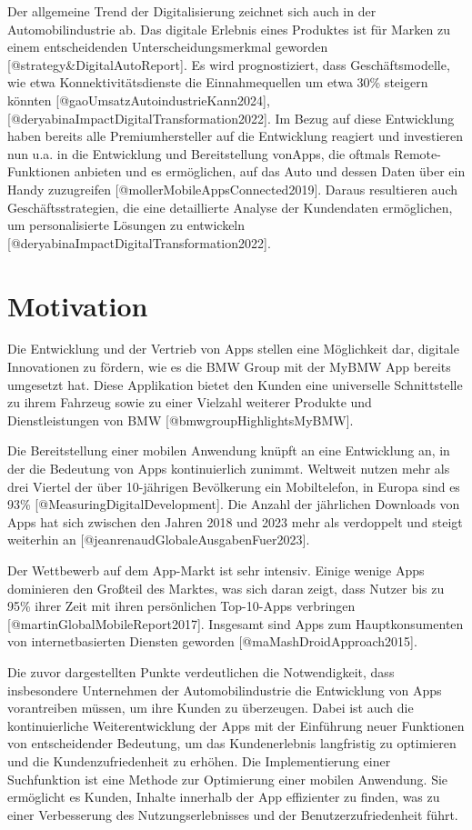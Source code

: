 \documentclass[
  12pt,
  a4paperpaper,
]{report}
\begin{document}
Der allgemeine Trend der Digitalisierung zeichnet sich auch in der
Automobilindustrie ab. Das digitale Erlebnis eines Produktes ist für
Marken zu einem entscheidenden Unterscheidungsmerkmal geworden
{[}@strategy\&DigitalAutoReport{]}. Es wird prognostiziert, dass
Geschäftsmodelle, wie etwa Konnektivitätsdienste die Einnahmequellen um
etwa 30\thinspace\% steigern könnten
{[}@gaoUmsatzAutoindustrieKann2024{]},
{[}@deryabinaImpactDigitalTransformation2022{]}. Im Bezug auf diese
Entwicklung haben bereits alle Premiumhersteller auf die Entwicklung
reagiert und investieren nun u.a. in die Entwicklung und Bereitstellung
vonApps, die oftmals Remote-Funktionen anbieten und es ermöglichen, auf
das Auto und dessen Daten über ein Handy zuzugreifen
{[}@mollerMobileAppsConnected2019{]}. Daraus resultieren auch
Geschäftsstrategien, die eine detaillierte Analyse der Kundendaten
ermöglichen, um personalisierte Lösungen zu entwickeln
{[}@deryabinaImpactDigitalTransformation2022{]}.

\section{Motivation}\label{motivation}

Die Entwicklung und der Vertrieb von Apps stellen eine Möglichkeit dar,
digitale Innovationen zu fördern, wie es die BMW Group mit der MyBMW App
bereits umgesetzt hat. Diese Applikation bietet den Kunden eine
universelle Schnittstelle zu ihrem Fahrzeug sowie zu einer Vielzahl
weiterer Produkte und Dienstleistungen von BMW
{[}@bmwgroupHighlightsMyBMW{]}.

Die Bereitstellung einer mobilen Anwendung knüpft an eine Entwicklung
an, in der die Bedeutung von Apps kontinuierlich zunimmt. Weltweit
nutzen mehr als drei Viertel der über 10-jährigen Bevölkerung ein
Mobiltelefon, in Europa sind es 93\thinspace\%
{[}@MeasuringDigitalDevelopment{]}. Die Anzahl der jährlichen Downloads
von Apps hat sich zwischen den Jahren 2018 und 2023 mehr als verdoppelt
und steigt weiterhin an {[}@jeanrenaudGlobaleAusgabenFuer2023{]}.

Der Wettbewerb auf dem App-Markt ist sehr intensiv. Einige wenige Apps
dominieren den Großteil des Marktes, was sich daran zeigt, dass Nutzer
bis zu 95\thinspace\% ihrer Zeit mit ihren persönlichen Top-10-Apps
verbringen {[}@martinGlobalMobileReport2017{]}. Insgesamt sind Apps zum
Hauptkonsumenten von internetbasierten Diensten geworden
{[}@maMashDroidApproach2015{]}.

Die zuvor dargestellten Punkte verdeutlichen die Notwendigkeit, dass
insbesondere Unternehmen der Automobilindustrie die Entwicklung von Apps
vorantreiben müssen, um ihre Kunden zu überzeugen. Dabei ist auch die
kontinuierliche Weiterentwicklung der Apps mit der Einführung neuer
Funktionen von entscheidender Bedeutung, um das Kundenerlebnis
langfristig zu optimieren und die Kundenzufriedenheit zu erhöhen. Die
Implementierung einer Suchfunktion ist eine Methode zur Optimierung
einer mobilen Anwendung. Sie ermöglicht es Kunden, Inhalte innerhalb der
App effizienter zu finden, was zu einer Verbesserung des
Nutzungserlebnisses und der Benutzerzufriedenheit führt.
\end{document}
